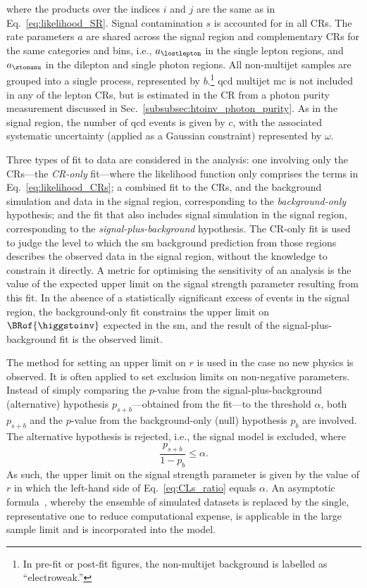 where the products over the indices $i$ and $j$ are the same as in Eq.~\ref{eq:likelihood_SR}. Signal contamination $s$ is accounted for in all \glspl{CR}. The rate parameters $a$ are shared across the signal region and complementary \glspl{CR} for the same categories and \ptmiss bins, i.e., $a_{\lostlepton}$ in the single lepton regions, and $a_{\ztonunu}$ in the dilepton and single photon regions. All non-multijet samples are grouped into a single process, represented by $b$.\footnote{In pre-fit or post-fit figures, the non-multijet background is labelled as ``electroweak.''} \acrshort{qcd} multijet \acrshort{mc} is not included in any of the lepton \glspl{CR}, but is estimated in the \singlePhotonCr \gls{CR} from a photon purity measurement discussed in Sec.~\ref{subsubsec:htoinv_photon_purity}. As in the signal region, the number of \acrshort{qcd} events is given by $c$, with the associated systematic uncertainty (applied as a Gaussian constraint) represented by $\omega$.

Three types of fit to data are considered in the analysis: one involving only the \glspl{CR}---the \emph{\gls{CR}-only} fit---where the likelihood function only comprises the terms in Eq.~\ref{eq:likelihood_CRs}; a combined fit to the \glspl{CR}, and the background simulation and data in the signal region, corresponding to the \emph{background-only} hypothesis; and the fit that also includes signal simulation in the signal region, corresponding to the \emph{signal-plus-background} hypothesis. The \gls{CR}-only fit is used to judge the level to which the \acrshort{sm} background prediction from those regions describes the observed data in the signal region, without the knowledge to constrain it directly. A metric for optimising the sensitivity of an analysis is the value of the expected upper limit on the signal strength parameter resulting from this fit. In the absence of a statistically significant excess of events in the signal region, the background-only fit constrains the upper limit on $\BRof{\higgstoinv}$ expected in the \acrshort{sm}, and the result of the signal-plus-background fit is the observed limit.

The \CLs method for setting an upper limit on $r$ is used in the case no new physics is observed. It is often applied to set exclusion limits on non-negative parameters. Instead of simply comparing the $p$-value from the signal-plus-background (alternative) hypothesis $p_{s+b}$---obtained from the fit---to the threshold $\alpha$, both $p_{s+b}$ and the $p$-value from the background-only (null) hypothesis $p_b$ are involved. The alternative hypothesis is rejected, i.e., the signal model is excluded, where
\begin{equation}
    \frac{p_{s+b}}{1 - p_b} \leq \alpha.
    \label{eq:CLs_ratio}
\end{equation}
As such, the upper limit on the signal strength parameter is given by the value of $r$ in which the left-hand side of Eq.~\ref{eq:CLs_ratio} equals $\alpha$. An asymptotic formula~\cite{Cowan:2010js}, whereby the ensemble of simulated datasets is replaced by the single, representative one to reduce computational expense, is applicable in the large sample limit and is incorporated into the model.

